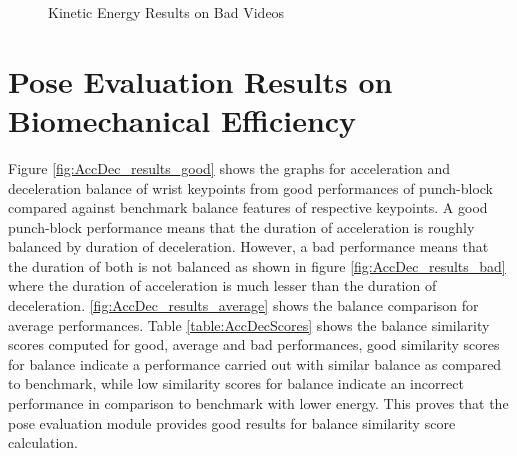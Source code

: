   \begin{figure}
   \quad 
    \caption{Kinetic Energy Results on Bad Videos} 
    \centering
    \label{fig:KE_results_bad}
  \end{figure}

  \section{Pose Evaluation Results on Biomechanical Efficiency}
  Figure \ref{fig:AccDec_results_good} shows the graphs for acceleration and deceleration balance of wrist keypoints from good performances of punch-block compared against benchmark balance features of respective keypoints. A good punch-block performance means that the duration of acceleration is roughly balanced by duration of deceleration. However, a bad performance means that the duration of both is not balanced as shown in figure \ref{fig:AccDec_results_bad} where the duration of acceleration is much lesser than the duration of deceleration. \ref{fig:AccDec_results_average} shows the balance comparison for average performances. Table \ref{table:AccDecScores} shows the balance similarity scores computed for good, average and bad performances, good similarity scores for balance indicate a performance carried out with similar balance as compared to benchmark, while low similarity scores for balance indicate an incorrect performance in comparison to benchmark with lower energy. This proves that the pose evaluation module provides good results for balance similarity score calculation. 

